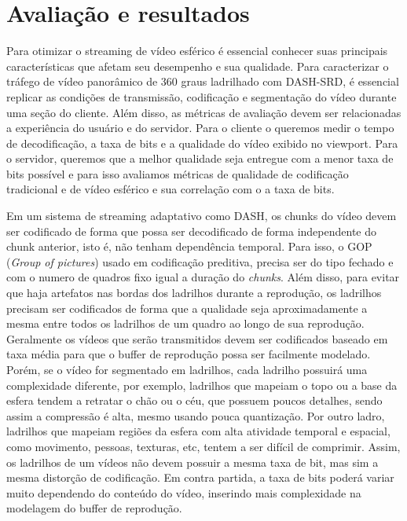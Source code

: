 \chapter{Avaliação e resultados}\label{Cap:Evaluation}

Para otimizar o streaming de vídeo esférico é essencial conhecer suas principais características que afetam seu desempenho e sua qualidade. Para caracterizar o tráfego de vídeo panorâmico de 360 graus ladrilhado com DASH-SRD, é essencial replicar as condições de transmissão, codificação e segmentação do vídeo durante uma seção do cliente. Além disso, as métricas de avaliação devem ser relacionadas a experiência do usuário e do servidor. Para o cliente o queremos medir o tempo de decodificação, a taxa de bits e a qualidade do vídeo exibido no viewport. Para o servidor, queremos que a melhor qualidade seja entregue com a menor taxa de bits possível e para isso avaliamos métricas de qualidade de codificação tradicional e de vídeo esférico e sua correlação com o a taxa de bits.

Em um sistema de streaming adaptativo como DASH, os chunks do vídeo devem ser codificado de forma que possa ser decodificado de forma independente do chunk anterior, isto é, não tenham dependência temporal. Para isso, o GOP (\textit{Group of pictures}) usado em codificação preditiva, precisa ser do tipo fechado e com o numero de quadros fixo igual a duração do \textit{chunks}. Além disso, para evitar que haja artefatos nas bordas dos ladrilhos durante a reprodução, os ladrilhos precisam ser codificados de forma que a qualidade seja aproximadamente a mesma entre todos os ladrilhos de um quadro ao longo de sua reprodução. Geralmente os vídeos que serão transmitidos devem ser codificados baseado em taxa média para que o buffer de reprodução possa ser facilmente modelado. Porém, se o vídeo for segmentado em ladrilhos, cada ladrilho possuirá uma complexidade diferente, por exemplo, ladrilhos que mapeiam o topo ou a base da esfera tendem a retratar o chão ou o céu, que possuem poucos detalhes, sendo assim a compressão é alta, mesmo usando pouca quantização. Por outro ladro, ladrilhos que mapeiam regiões da esfera com alta atividade temporal e espacial, como movimento, pessoas, texturas, etc, tentem a ser difícil de comprimir. Assim, os ladrilhos de um vídeos não devem possuir a mesma taxa de bit, mas sim a mesma distorção de codificação. Em contra partida, a taxa de bits poderá variar muito dependendo do conteúdo do vídeo, inserindo mais complexidade na modelagem do buffer de reprodução.


